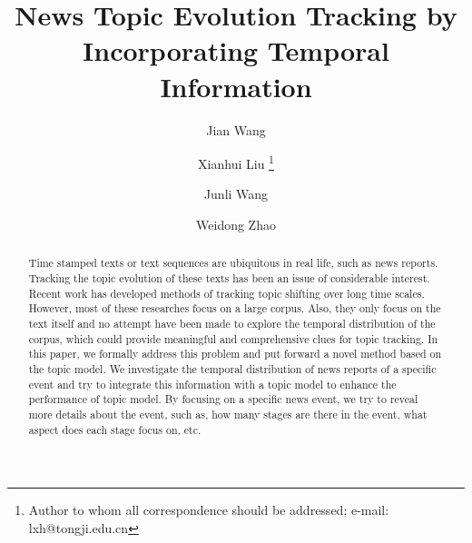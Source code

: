 \documentclass[runningheads,a4paper]{llncs}
\begin{document}
\mainmatter  %

\title{News Topic Evolution Tracking by Incorporating Temporal Information}


%
%

\author{Jian Wang\and Xianhui Liu%
\thanks{Author to whom all correspondence should be addressed; e-mail: lxh@tongji.edu.cn}%
\and Junli Wang\and Weidong Zhao}




%
%

\maketitle


\begin{abstract}
Time stamped texts or text sequences are ubiquitous in real life, such as news reports. Tracking the topic evolution of these texts has been an issue of considerable interest. Recent work has developed methods of tracking topic shifting over long time scales. However, most of these researches focus on a large corpus. Also, they only focus on the text itself and no attempt have been made to explore the temporal distribution of the corpus, which could provide meaningful and comprehensive clues for topic tracking. In this paper, we formally address this problem and put forward a novel method based on the topic model. We investigate the temporal distribution of news reports of a specific event and try to integrate this information with a topic model to enhance the performance of topic model. By focusing on a specific news event, we try to reveal more details about the event, such as, how many stages are there in the event, what aspect does each stage focus on, etc.
\end{abstract}
\end{document}
